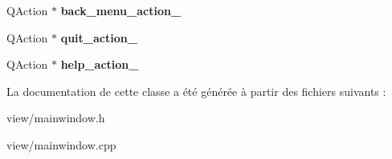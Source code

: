 \begin{DoxyCompactItemize}
\item 
\hypertarget{classMainWindow_a2bd080326948948b8137f07232712458}{Q\+Action $\ast$ {\bfseries back\+\_\+menu\+\_\+action\+\_\+}}\label{classMainWindow_a2bd080326948948b8137f07232712458}

\item 
\hypertarget{classMainWindow_a860806ffe399e1e09ba3a7e11e67ccb3}{Q\+Action $\ast$ {\bfseries quit\+\_\+action\+\_\+}}\label{classMainWindow_a860806ffe399e1e09ba3a7e11e67ccb3}

\item 
\hypertarget{classMainWindow_a570542457aa484877f34441f003b9f5e}{Q\+Action $\ast$ {\bfseries help\+\_\+action\+\_\+}}\label{classMainWindow_a570542457aa484877f34441f003b9f5e}

\end{DoxyCompactItemize}


La documentation de cette classe a été générée à partir des fichiers suivants \+:\begin{DoxyCompactItemize}
\item 
view/mainwindow.\+h\item 
view/mainwindow.\+cpp\end{DoxyCompactItemize}
